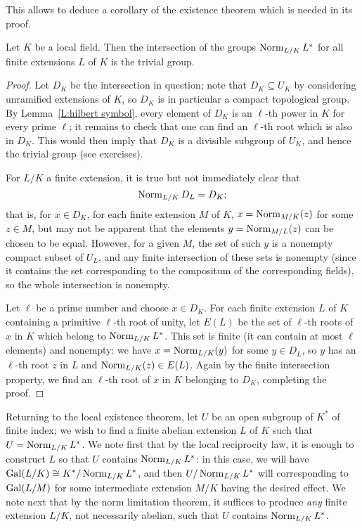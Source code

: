This allows to deduce a corollary of the existence theorem which is needed in its proof.
\begin{cor} \label{C:universal norms divisible}
Let $K$ be a local field.
Then the intersection of the groups $\operatorname{Norm}_{L/K} L^*$ for all finite extensions $L$ of $K$ is the trivial group.
\end{cor}
\begin{proof}
Let $D_K$ be the intersection in question; note that $D_K \subseteq U_K$ by considering unramified extensions of $K$, so $D_K$ is in particular a compact topological group.
By Lemma~\ref{L:hilbert symbol}, every element of $D_K$ is an $\ell$-th power in $K$ for every prime $\ell$; it remains to check that one can find an $\ell$-th root which is also in $D_K$. This would then imply that $D_K$ is a divisible subgroup of $U_K$, and hence the trivial group (see exercises).

For $L/K$ a finite extension, it is true but  not immediately clear that 
\[
\operatorname{Norm}_{L/K} D_L = D_K;
\]
that is, for $x \in D_K$, for each finite extension $M$ of $K$, $x = \operatorname{Norm}_{M/K}(z)$ for some $z \in M$, but may not be apparent that the elements $y = \operatorname{Norm}_{M/L}(z)$ can be chosen to be equal. However, for a given $M$, the set of such $y$ is a nonempty compact subset of $U_L$, and any finite intersection of these sets is nonempty (since it contains the set corresponding to the compositum of the corresponding fields), so the whole intersection is nonempty.

Let $\ell$ be a prime number and choose $x \in D_K$. For each finite extension $L$ of $K$ containing a primitive $\ell$-th root of unity, let $E(L)$ be the set of $\ell$-th roots of $x$ in $K$ which belong to $\operatorname{Norm}_{L/K} L^*$.
This set is finite (it can contain at most $\ell$ elements) and nonempty: we have $x = \operatorname{Norm}_{L/K}(y)$ for some $y \in D_L$, so $y$ has an $\ell$-th root $z$ in $L$ 
and $\operatorname{Norm}_{L/K}(z) \in E(L)$. Again by the finite intersection property,
we find an $\ell$-th root of $x$ in $K$ belonging to $D_K$, completing the proof.
\end{proof}

Returning to the local existence theorem,
let $U$ be an open subgroup of $K^*$ of finite index; we wish to find a finite abelian extension $L$ of $K$ such that $U = \operatorname{Norm}_{L/K}L^*$. 
We note first that by the local reciprocity law, it is enough to construct $L$ so that
$U$ contains $\operatorname{Norm}_{L/K}L^*$: in this case, we will have $\operatorname{Gal}(L/K) \cong K^*/\operatorname{Norm}_{L/K}L^*$, and then $U/\operatorname{Norm}_{L/K}L^*$ will corresponding to $\operatorname{Gal}(L/M)$ for some intermediate extension $M/K$ having the desired effect. We note next that by the norm limitation theorem, it suffices to produce \emph{any} finite extension $L/K$, not necessarily abelian, such that $U$ contains $\operatorname{Norm}_{L/K}L^*$.

